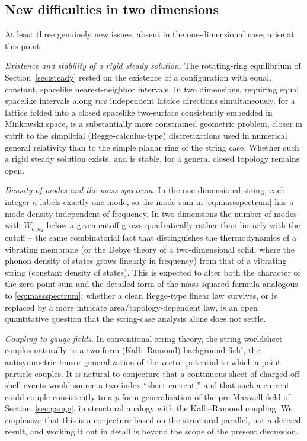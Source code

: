\documentclass[11pt]{article}
\begin{document}
\subsection{New difficulties in two dimensions}

At least three genuinely new issues, absent in the one-dimensional case, arise
at this point.

\emph{Existence and stability of a rigid steady solution.} The rotating-ring
equilibrium of Section~\ref{sec:steady} rested on the existence of a
configuration with equal, constant, spacelike nearest-neighbor intervals. In
two dimensions, requiring equal spacelike intervals along \emph{two}
independent lattice directions simultaneously, for a lattice folded into a
closed spacelike two-surface consistently embedded in Minkowski space, is a
substantially more constrained geometric problem, closer in spirit to the
simplicial (Regge-calculus-type) discretizations used in numerical general
relativity than to the simple planar ring of the string case. Whether such a
rigid steady solution exists, and is stable, for a general closed topology
remains open.

\emph{Density of modes and the mass spectrum.} In the one-dimensional string,
each integer $n$ labels exactly one mode, so the mode sum in
\eqref{eq:massspectrum} has a mode density independent of frequency. In two
dimensions the number of modes with $W_{n_1n_2}$ below a given cutoff grows
quadratically rather than linearly with the cutoff -- the same combinatorial
fact that distinguishes the thermodynamics of a vibrating membrane (or the
Debye theory of a two-dimensional solid, where the phonon density of states
grows linearly in frequency) from that of a vibrating string (constant density
of states). This is expected to alter both the character of the zero-point
sum and the detailed form of the mass-squared formula analogous to
\eqref{eq:massspectrum}; whether a clean Regge-type linear law survives, or is
replaced by a more intricate area/topology-dependent law, is an open
quantitative question that the string-case analysis alone does not settle.

\emph{Coupling to gauge fields.} In conventional string theory, the string
worldsheet couples naturally to a two-form (Kalb--Ramond) background field, the
antisymmetric-tensor generalization of the vector potential to which a point
particle couples. It is natural to conjecture that a continuous sheet of
charged off-shell events would source a two-index ``sheet current,'' and that
such a current could couple consistently to a $p$-form generalization of the
pre-Maxwell field of Section~\ref{sec:gauge}, in structural analogy with the
Kalb--Ramond coupling. We emphasize that this is a conjecture based on the
structural parallel, not a derived result, and working it out in detail is
beyond the scope of the present discussion.
\end{document}
